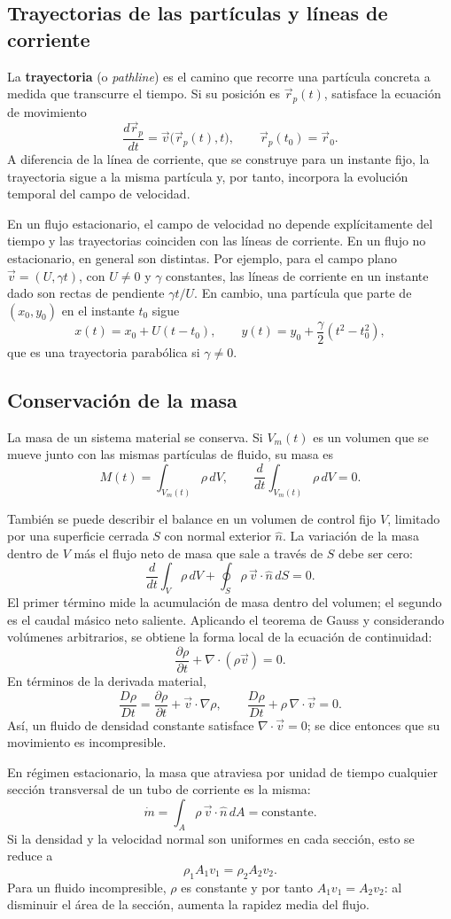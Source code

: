 \subsection{Trayectorias de las partículas y líneas de corriente}

La \textbf{trayectoria} (o \emph{pathline}) es el camino que recorre una partícula concreta a medida que transcurre el tiempo. Si su posición es $\vec r_p(t)$, satisface la ecuación de movimiento
\[
\frac{d\vec r_p}{dt}=\vec v\bigl(\vec r_p(t),t\bigr),
\qquad
\vec r_p(t_0)=\vec r_0.
\]
A diferencia de la línea de corriente, que se construye para un instante fijo, la trayectoria sigue a la misma partícula y, por tanto, incorpora la evolución temporal del campo de velocidad.

En un flujo estacionario, el campo de velocidad no depende explícitamente del tiempo y las trayectorias coinciden con las líneas de corriente. En un flujo no estacionario, en general son distintas. Por ejemplo, para el campo plano $\vec v=(U,\gamma t)$, con $U\ne0$ y $\gamma$ constantes, las líneas de corriente en un instante dado son rectas de pendiente $\gamma t/U$. En cambio, una partícula que parte de $(x_0,y_0)$ en el instante $t_0$ sigue
\[
x(t)=x_0+U(t-t_0),
\qquad
y(t)=y_0+\frac{\gamma}{2}(t^2-t_0^2),
\]
que es una trayectoria parabólica si $\gamma\ne0$.

\subsection{Conservación de la masa}

La masa de un sistema material se conserva. Si $V_m(t)$ es un volumen que se mueve junto con las mismas partículas de fluido, su masa es
\[
M(t)=\int_{V_m(t)}\rho\,dV,
\qquad
\frac{d}{dt}\int_{V_m(t)}\rho\,dV=0.
\]

También se puede describir el balance en un volumen de control fijo $V$, limitado por una superficie cerrada $S$ con normal exterior $\hat n$. La variación de la masa dentro de $V$ más el flujo neto de masa que sale a través de $S$ debe ser cero:
\[
\frac{d}{dt}\int_V\rho\,dV
+\oint_S\rho\,\vec v\cdot\hat n\,dS=0.
\]
El primer término mide la acumulación de masa dentro del volumen; el segundo es el caudal másico neto saliente. Aplicando el teorema de Gauss y considerando volúmenes arbitrarios, se obtiene la forma local de la ecuación de continuidad:
\[
\boxed{\frac{\partial\rho}{\partial t}+\nabla\cdot(\rho\vec v)=0.}
\]
En términos de la derivada material,
\[
\frac{D\rho}{Dt}
=\frac{\partial\rho}{\partial t}+\vec v\cdot\nabla\rho,
\qquad
\frac{D\rho}{Dt}+\rho\,\nabla\cdot\vec v=0.
\]
Así, un fluido de densidad constante satisface $\nabla\cdot\vec v=0$; se dice entonces que su movimiento es incompresible.

En régimen estacionario, la masa que atraviesa por unidad de tiempo cualquier sección transversal de un tubo de corriente es la misma:
\[
\dot m=\int_A\rho\,\vec v\cdot\hat n\,dA=\text{constante}.
\]
Si la densidad y la velocidad normal son uniformes en cada sección, esto se reduce a
\[
\rho_1A_1v_1=\rho_2A_2v_2.
\]
Para un fluido incompresible, $\rho$ es constante y por tanto $A_1v_1=A_2v_2$: al disminuir el área de la sección, aumenta la rapidez media del flujo.